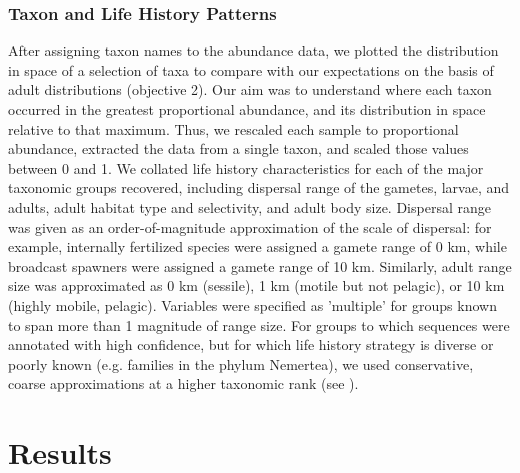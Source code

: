 \documentclass[11pt,letterpaper]{article} %
\begin{document}
\subsubsection*{Taxon and Life History Patterns}
After assigning taxon names to the abundance data, we plotted the distribution in space of a selection of taxa to compare with our expectations on the basis of adult distributions (objective 2). Our aim was to understand where each taxon occurred in the greatest proportional abundance, and its distribution in space relative to that maximum. Thus, we rescaled each sample to proportional abundance, extracted the data from a single taxon, and scaled those values between 0 and 1. We collated  life history characteristics for each of the major taxonomic groups recovered, including dispersal range of the gametes, larvae, and adults, adult habitat type and selectivity, and adult body size. Dispersal range was given as an order-of-magnitude approximation of the scale of dispersal: for example, internally fertilized species were assigned a gamete range of 0 km, while broadcast spawners were assigned a gamete range of 10 km. Similarly, adult range size was approximated as 0 km (sessile), 1 km (motile but not pelagic), or 10 km (highly mobile, pelagic). Variables were specified as 'multiple' for groups known to span more than 1 magnitude of range size. For groups to which sequences were annotated with high confidence, but for which life history strategy is diverse or poorly known (e.g. families in the phylum Nemertea), we used conservative, coarse approximations at a higher taxonomic rank (see ).



\section*{Results}
\end{document}
